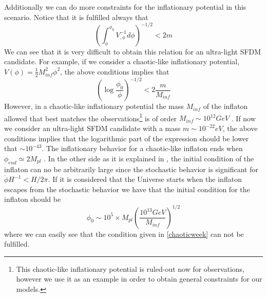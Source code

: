 \documentclass[amssymb,twocolumn,prd,nofootinbib,showpacs]{revtex4-1}
\begin{document}
Additionally we can do more constraints for the inflationary potential in this scenario. Notice that it is fulfilled always that
\begin{equation}
\left(\int^{\phi_0}_\phi V_{,\phi}^{-1}d\phi\right)^{-1/2}<2m
\end{equation}
We can see that it is very difficult to obtain this relation for an ultra-light SFDM candidate. For example, if we consider a chaotic-like inflationary potential, $V(\phi)=\frac{1}{2}M_{inf}^2\phi^2$, the above conditions implies that
\begin{equation}\label{chaoticweek}
\left(\log\frac{\phi_0}{\phi}\right)^{-1/2}<2\frac{m}{M_{inf}}
\end{equation}
However, in a chaotic-like inflationary potential the mass $M_{inf}$ of the inflaton allowed that best matches the observations\footnote{This chaotic-like inflationary potential is ruled-out now for observations, however we use it as an example in order to obtain general constraints for our models.} is of order $M_{inf}\sim 10^{12} GeV$ \cite{Liddle}. If now we consider an ultra-light SFDM candidate with a mass $m\sim 10^{-22}eV$, the above conditions implies that the logarithmic part of the expression should be lower that $\sim 10^{-43}$. The inflationary behavior for a chaotic-like inflaton ends when $\phi_{end}\simeq 2M_{pl}$ \cite{curvatonatractor,Liddle}. In the other side as it is explained in \cite{curvatonatractor}, the initial condition of the inflaton can no be arbitrarily large since the stochastic behavior is significant for $\dot\phi H^{-1}<H/2\pi$. If it is considered that the Universe starts when the inflaton escapes from the stochastic behavior we have that the initial condition for the inflaton should be
\begin{equation}\label{phi_0}
\phi_0\sim 10^5\times M_{pl}\left(\frac{10^{13}GeV}{M_{inf}}\right)^{1/2}
\end{equation}
where we can easily see that the condition given in \eqref{chaoticweek} can not be fulfilled.
\end{document}

